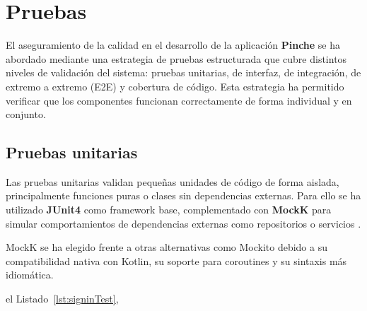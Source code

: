 \section{Pruebas}
\label{sec:pruebas}

El aseguramiento de la calidad en el desarrollo de la aplicación \textbf{Pinche} se ha abordado mediante una estrategia de pruebas estructurada que cubre distintos niveles de validación del sistema: pruebas unitarias, de interfaz, de integración, de extremo a extremo (E2E) y cobertura de código. Esta estrategia ha permitido verificar que los componentes funcionan correctamente de forma individual y en conjunto.

\subsection{Pruebas unitarias}

Las pruebas unitarias validan pequeñas unidades de código de forma aislada, principalmente funciones puras o clases sin dependencias externas. Para ello se ha utilizado \textbf{JUnit4} como framework base, complementado con \textbf{MockK} para simular comportamientos de dependencias externas como repositorios o servicios \cite{android-testing}.

MockK se ha elegido frente a otras alternativas como Mockito debido a su compatibilidad nativa con Kotlin, su soporte para coroutines y su sintaxis más idiomática.

el Listado~\ref{lst:signinTest},

